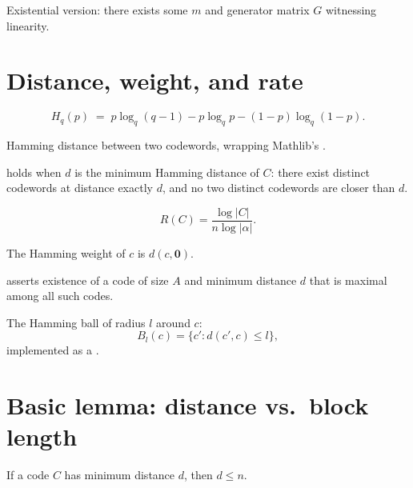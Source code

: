 \begin{definition}
\leanok
Existential version: there exists some $m$ and generator matrix $G$ witnessing linearity.
\end{definition}

\section{Distance, weight, and rate}

\begin{definition}
\leanok
\[
H_q(p) \;=\; p\log_q(q-1) - p\log_q p - (1-p)\log_q(1-p).
\]
\end{definition}

\begin{definition}
\leanok
Hamming distance between two codewords, wrapping Mathlib's .
\end{definition}

\begin{definition}
\leanok
{} holds when $d$ is the minimum Hamming distance of $C$: there
exist distinct codewords at distance exactly $d$, and no two distinct codewords
are closer than $d$.
\end{definition}

\begin{definition}[Rate]
\leanok
\[
R(C) = \frac{\log|C|}{n\log|\alpha|}.
\]
\end{definition}

\begin{definition}[Weight]
\leanok
The Hamming weight of $c$ is $d(c, \mathbf{0})$.
\end{definition}

\begin{definition}
\leanok
{} asserts existence of a code of size $A$ and minimum distance $d$
that is maximal among all such codes.
\end{definition}

\begin{definition}
\leanok
The Hamming ball of radius $l$ around $c$:
\[
B_l(c) = \{c' : d(c',c) \le l\},
\]
implemented as a .
\end{definition}

\section{Basic lemma: distance vs.\ block length}

\begin{lemma}
\leanok
If a code $C$ has minimum distance $d$, then $d \le n$.
\end{lemma}
